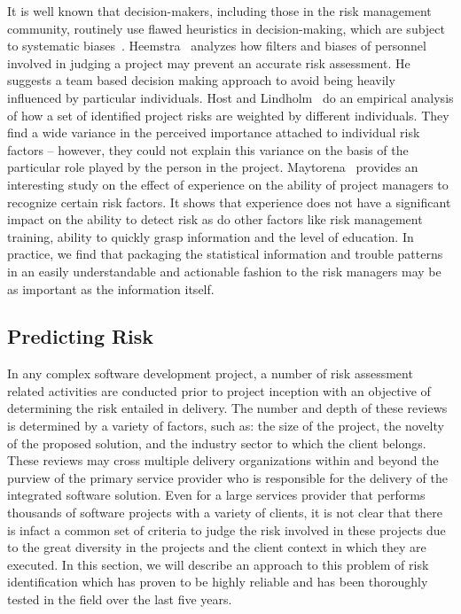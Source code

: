 It is well known that decision-makers, including those in the risk management community, routinely use flawed heuristics in decision-making, which are subject to systematic biases~\cite{risk27}. Heemstra~\cite{risk24} analyzes how filters and biases of personnel involved in judging a project may prevent an accurate risk assessment. He suggests a team based decision making approach to avoid being heavily influenced by particular individuals. Host and Lindholm~\cite{risk25}  do an empirical analysis of how a set of identified project risks are weighted by different individuals. They find a wide variance in the perceived importance attached to individual risk factors -- however, they could not explain this variance on the basis of the particular role played by the person in the project. Maytorena~\cite{risk26} provides an interesting study on the effect of experience on the ability of project managers to recognize certain risk factors. It shows that experience does not have a significant impact on the ability to detect risk as do other factors like risk management training, ability to quickly grasp information and the level of education. In practice, we find that packaging the statistical information and trouble patterns in an easily understandable and actionable fashion to the risk managers may be as important as the information itself.

\subsection{Predicting Risk}
 In any complex software development project, a number of risk assessment related activities are conducted prior to project inception with an objective of determining the risk entailed in delivery. The number and depth of these reviews is determined by a variety of factors, such as: the size of the project, the novelty of the proposed solution, and the industry sector to which the client belongs. These reviews may cross multiple delivery organizations within and beyond the purview of the primary service provider who is responsible for the delivery of the integrated software solution. Even for a large services provider that performs thousands of software projects with a variety of clients, it is not clear that there is infact a common set of criteria to judge the risk involved in these projects due to the great diversity in the projects and the client context in which they are executed. In this section, we will describe an approach to this problem of risk identification which has proven to be highly reliable and has been thoroughly tested in the field over the last five years.


